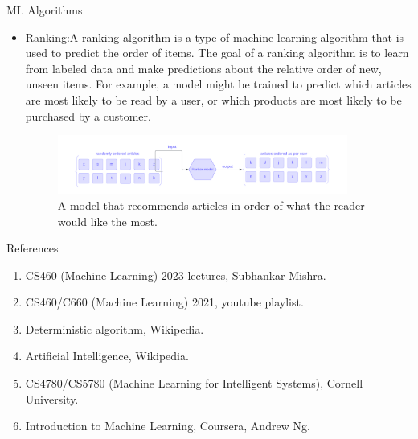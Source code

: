 \documentclass[11pt,notheorems,hyperref={pdfauthor=whatever}]{beamer}
\begin{document}
\begin{frame}{ML Algorithms}
\begin{itemize}
\item \alert{Ranking:}A ranking algorithm is a type of machine learning algorithm that is used to predict the order of items. The goal of a ranking algorithm is to learn from labeled data and make predictions about the relative order of new, unseen items. For example, a model might be trained to predict which articles are most likely to be read by a user, or which products are most likely to be purchased by a customer.
\begin{figure}
    \centering
    \includegraphics[width=0.9\textwidth]{figures/ranker.png}
    \caption{A model that recommends articles in order of what the reader would like the most.}
    \label{fig:multiclass classification}
\end{figure}
\end{itemize}
\end{frame}

\begin{frame}[allowframebreaks]{References}
    \begin{enumerate}
        \item CS460 (Machine Learning) 2023 lectures, Subhankar Mishra.
        \item CS460/C660 (Machine Learning) 2021, youtube playlist.
        \item Deterministic algorithm, Wikipedia.
        \item Artificial Intelligence, Wikipedia.
        \item CS4780/CS5780 (Machine Learning for Intelligent Systems), Cornell University.
        \item Introduction to Machine Learning, Coursera, Andrew Ng. 
    \end{enumerate}
\end{frame}
\end{document}

